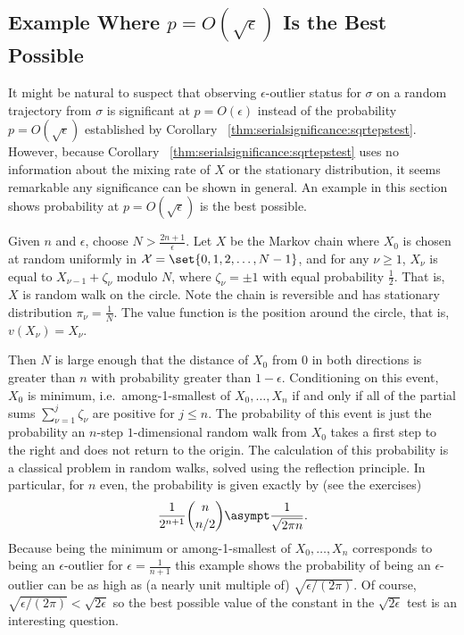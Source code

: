 \documentclass[12pt]{article}
\begin{document}
\subsection*{Example Where \( p = O(\sqrt{\epsilon}) \) Is the Best
Possible}

It might be natural to suspect that observing \( \epsilon \)-outlier
status for \( \sigma \) on a random trajectory from \( \sigma \) is
significant at \( p = O(\epsilon) \) instead of the probability \( p = O
(\sqrt{\epsilon}) \) established by Corollary~%
\ref{thm:serialsignificance:sqrtepstest}.  However, because Corollary~%
\ref{thm:serialsignificance:sqrtepstest} uses no information about the
mixing rate of \( X \) or the stationary distribution, it seems
remarkable any significance can be shown in general.  An example in this
section shows probability at \( p = O( \sqrt{\epsilon}) \) is the best
possible.

Given \( n \) and \( \epsilon \), choose \( N > \frac{2n+1}{\epsilon} \).
Let \( X \) be the Markov chain where \( X_0 \) is chosen at random
uniformly in \( \mathcal{X} = \set{0, 1, 2, \dots , N-1} \), and for any
\( \nu \ge 1 \), \( X_{\nu} \) is equal to \( X_{\nu-1} + \zeta_{\nu} \)
modulo \( N \), where \( \zeta_{\nu} = \pm 1 \) with equal probability \(
\frac{1}{2} \).  That is, \( X \) is random walk on the circle.  Note
the chain is reversible and has stationary distribution \( \pi_\nu =
\frac{1}{N} \).  %
The value function is the position around the circle, that is, \( v (X_{\nu})
= X_{\nu} \).  %

Then \( N \) is large enough that the distance of \( X_0 \) from \( 0 \)
in both directions is greater than \( n \) with probability greater than
\( 1 - \epsilon \).  Conditioning on this event, \( X_0 \) is minimum,
i.e.\ among-1-smallest of \( X_0, \dots , X_n \) if and only if all of
the partial sums \( \sum\limits_{\nu=1}^{j} \zeta_\nu \) are positive
for \( j \le n \).  The probability of this event is just the
probability an \( n \)-step \( 1 \)-dimensional random walk from \( X_0 \)
takes a first step to the right and does not return to the origin.  The
calculation of this probability is a classical problem in random walks,
solved using the reflection principle.  In particular, for \( n \) even,
the probability is given exactly by (see the exercises)
\[
    \frac{1}{2^{n+1}}\binom{n}{n/2} \asympt \frac{1}{\sqrt{2 \pi n}}.
\] Because being the minimum or among-1-smallest of \( X_0, \dots , X_n \)
corresponds to being an \( \epsilon \)-outlier for \( \epsilon = \frac{1}
{n+1} \) this example shows the probability of being an \( \epsilon \)-outlier
can be as high as (a nearly unit multiple of) \( \sqrt{\epsilon/(2\pi)} \).
Of course, \( \sqrt{\epsilon/ (2\pi)} < \sqrt{2\epsilon} \) so the best
possible value of the constant in the \( \sqrt{2\epsilon} \) test is an
interesting question.
\end{document}

